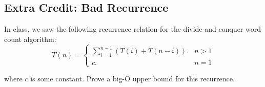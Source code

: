\documentclass[11pt]{article}
\begin{document}
\subsection*{Extra Credit: Bad Recurrence}

In class, we saw the following recurrence relation for the divide-and-conquer word count algorithm:
\[ T(n) = \begin{cases}
\sum_{i=1}^{n-1} ( T(i) + T(n-i)).    & n > 1 \\
c.   & n = 1
\end{cases} \]

where $c$ is some constant.
Prove a big-O upper bound for this recurrence.
\end{document}
